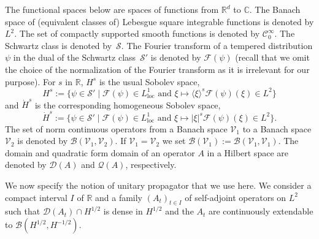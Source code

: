 \documentclass[12pt]{article}
\theoremstyle{plain}
\begin{document}
The functional spaces below are spaces of functions from $\mathbb{R}^d$ to $\mathbb{C}$. The Banach space of (equivalent classes of) Lebesgue square integrable functions is denoted by $L^2$. The set of compactly supported smooth functions is denoted by $\mathcal{C}^\infty_0$. The Schwartz class is denoted by~$\mathcal{S}$. The Fourier transform of a tempered distribution $\psi$ in the dual of the Schwartz class~$\mathcal{S}'$ is denoted by $\mathcal{F}(\psi)$ (recall that we omit the choice of the normalization of the Fourier transform as it is irrelevant for our purpose). For $s$ in $\mathbb{R}$, $H^{s}$ is the usual Sobolev space, 
\begin{equation*}
    H^s:=\{\psi\in \mathcal{S}'\mid \mathcal{F}(\psi)\in L^1_{\mathrm{loc}} \text{ and } \xi \mapsto \langle\xi\rangle^s\mathcal{F}(\psi)(\xi)\in L^2\}
\end{equation*}
and $\dot{H}^{s}$ is the corresponding  homogeneous Sobolev space, 
\begin{equation*}
    \dot{H}^s:=\{ \psi\in \mathcal{S}'\mid \mathcal{F}(\psi)\in L^1_{\mathrm{loc}} \text{ and } \xi \mapsto |\xi|^s\mathcal{F}(\psi)(\xi)\in L^2\}.
\end{equation*}
The set of norm continuous operators from a Banach space $\mathcal{V}_1$ to a Banach space $\mathcal{V}_2$ is denoted by $\mathcal{B}(\mathcal{V}_1,\mathcal{V}_2)$. If $\mathcal{V}_1=\mathcal{V}_2$ we set $\mathcal{B}(\mathcal{V}_1):=\mathcal{B}(\mathcal{V}_1,\mathcal{V}_1)$. The domain and quadratic form domain of an operator $A$ in a Hilbert space are denoted by $\mathcal{D}(A)$ and $\mathcal{Q}(A)$, respectively.


We now specify the notion of unitary propagator that we use here.
 We consider a compact interval  $I$ of $\mathbb{R}$ and a family $(A_t)_{t\in I}$ of self-adjoint operators on $L^2$ such that $\mathcal{D}(A_t)\cap H^{1/2}$ is dense in $H^{1/2}$ and the $A_t$ are continuously extendable to $\mathcal{B}(H^{1/2},H^{-1/2})$.
 
\end{document}
